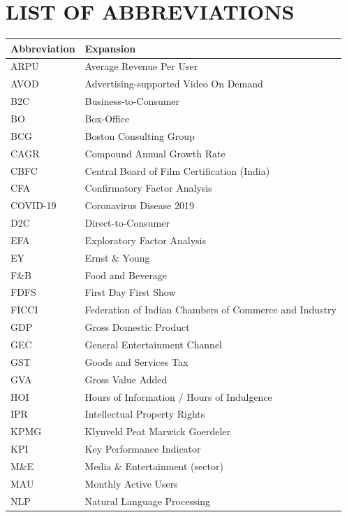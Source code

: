 \chapter*{LIST OF ABBREVIATIONS}

\begin{tabularx}{\textwidth}{l X}
\toprule
\textbf{Abbreviation} & \textbf{Expansion}\\
\midrule
ARPU      & Average Revenue Per User \\
AVOD      & Advertising-supported Video On Demand \\
B2C       & Business-to-Consumer \\
BO        & Box-Office \\
BCG       & Boston Consulting Group \\
CAGR      & Compound Annual Growth Rate \\
CBFC      & Central Board of Film Certification (India) \\
CFA       & Confirmatory Factor Analysis \\
COVID-19  & Coronavirus Disease 2019 \\
D2C       & Direct-to-Consumer \\
EFA       & Exploratory Factor Analysis \\
EY        & Ernst \& Young \\
F\&B      & Food and Beverage \\
FDFS      & First Day First Show \\
FICCI     & Federation of Indian Chambers of Commerce and Industry \\
GDP       & Gross Domestic Product \\
GEC       & General Entertainment Channel \\
GST       & Goods and Services Tax \\
GVA       & Gross Value Added \\
HOI       & Hours of Information / Hours of Indulgence \\
IPR       & Intellectual Property Rights \\
KPMG      & Klynveld Peat Marwick Goerdeler \\
KPI       & Key Performance Indicator \\
M\&E      & Media \& Entertainment (sector) \\
MAU       & Monthly Active Users \\
NLP       & Natural Language Processing \\

\end{tabularx}
